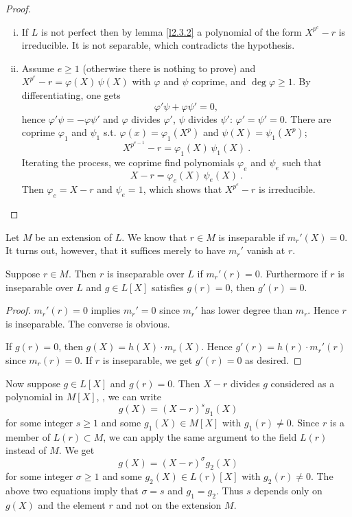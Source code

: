 \begin{proof}
~
\begin{enumerate}[(i)]
\item
If $L$ is not perfect then by lemma \ref{l2.3.2} a polynomial of the form $X^{p^{e}}-r$ is irreducible. It is not separable, which contradicts the hypothesis.
\item
Assume $e\geq 1$ (otherwise there is nothing to prove) and $X^{p^{e}}-r = \varphi(X)\, \psi(X)$ with $\varphi$ and $\psi$ coprime, and $\deg \varphi \geq 1$. By differentiating, one gets 
$$\varphi' \psi + \varphi \psi' = 0 ,$$
hence $\varphi' \psi =-\varphi \psi'$ and $\varphi$ divides $\varphi'$, $\psi$ divides $\psi'$: $\varphi' = \psi' = 0$. There are coprime $\varphi_1$ and $\psi_1$ s.t. $\varphi(x) = \varphi_1(X^p)$ and $\psi(X)=\psi_1(X^p)$; 
$$X^{p^{e-1}}-r = \varphi_1(X)\, \psi_1(X)\ .$$
Iterating the process, we coprime find polynomials $\varphi_e$ and $\psi_e$ such that 
$$X-r = \varphi_e(X)\, \psi_e(X)\ .$$
Then $\varphi_e = X-r$ and $\psi_e=1$, which shows that $X^{p^{e}}-r$ is irreducible.


\end{enumerate}
\end{proof}

Let $M$ be an extension of $L$. We know that $r\in M$ is inseparable if $m_{r}'(X)= 0$. It turns out, however, that it suffices merely to have $m_{r}'$ vanish at $r$.

\begin{prop}
\label{p2.3.6}
Suppose $r\in M$. Then $r$ is inseparable over $L$ if $m_{r}'(r)=0$. Furthermore if $r$ is inseparable over $L$ and $g\in L[X]$ satisfies $g(r)=0$, then $g'(r)=0$.
\end{prop}

\begin{proof}
$m_{r}'(r)=0$ implies $m_{r}'=0$ since $m_{r}'$ has lower degree than $m_{r}$. Hence $r$ is inseparable. The converse is obvious.

If $g(r)=0$, then $g(X)=h(X)\cdot m_{r}(X)$. Hence $g'(r)=h(r)\cdot m_{r}'(r)$ since $m_{r}(r)=0$. If $r$ is inseparable, we get $g'(r)=0$ as desired.
\end{proof}
Now suppose $g\in L[X]$ and $g(r)=0$. Then $X-r$ divides $g$ considered as a polynomial in $M[X]$, \ie, we can write
$$
g(X)=(X-r)^{s}g_{1}(X)
$$
for some integer $s\geq 1$ and some $g_{1}(X)\in M[X]$ with $g_{1}(r)\neq 0$. Since $r$ is a member of $L(r)\subset M$, we can apply the same argument to the field $L(r)$ instead of $M$. We get
$$
g(X)=(X-r)^{\sigma}g_{2}(X)
$$
for some integer $\sigma\geq 1$ and some $g_{2}(X)\in L(r)[X]$ with $g_{2}(r)\neq 0$. The above two equations imply that $\sigma=s$ and $g_{1}=g_{2}$. Thus $s$ depends only on $g(X)$ and the element $r$ and not on the extension $M$.

